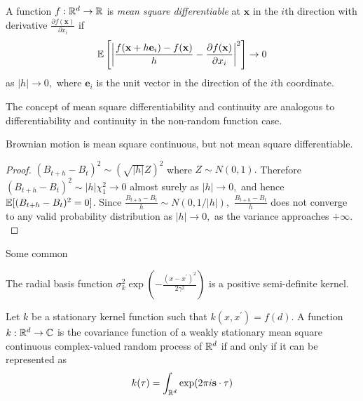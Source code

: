 \begin{definition}
    A function $f:\mathbb{R}^d\to\mathbb{R}$ is \emph{mean square differentiable} at
    $\mathbf{x}$ in the $i$th direction with derivative
    $\frac{\partial f(\mathbf{x})}{\partial x_i}$ if
    $$
        \operatorname{\mathbb{E}}\left[
            \left|
            \frac{f(\mathbf{x} + h\mathbf{e}_i) - f(\mathbf{x})}{h}
            - \frac{\partial f(\mathbf{x})}{\partial x_i}
            \right|^2
            \right]\to 0
    $$ as $|h|\to 0,$ where $\mathbf{e}_i$ is the unit vector in the direction
    of the $i$th coordinate.
\end{definition}

The concept of mean square differentiability and continuity are analogous to
differentiability and continuity in the non-random function case.

\begin{theorem}
    Brownian motion is mean square continuous, but not mean square
    differentiable.
\end{theorem}
\begin{proof}
    $(B_{t + h} - B_t)^2 \sim (\sqrt{|h|}Z)^2$ where $Z\sim N(0,1).$ Therefore
    $(B_{t + h} - B_t)^2 \sim |h|\chi_1^2 \to 0$ almost surely as $|h|\to 0,$
    and hence $\operatorname{\mathbb{E}}[(B_{t + h} - B_t)^2= 0]$. Since
    $\frac{B_{t + h} - B_t}{h} \sim N(0, 1/|h|),$ $\frac{B_{t + h} - B_t}{h}$
    does not converge to any valid probability distribution as $|h| \to 0,$ as
    the variance approaches $+\infty.$
\end{proof}

Some common

\color{red}

\begin{theorem}\label{thm:rbf_pos_def}
    The radial basis function
    ${\sigma^2_k}\exp(-\frac{(x - x^\prime)^2}{2\gamma^2})$ is a positive
    semi-definite kernel.
\end{theorem}

\begin{theorem}
    Let $k$ be a stationary kernel function such that
    $k(x, x^\prime) = f(d)$. A function $k:\mathbb{R}^d\to\mathbb{C}$ is the covariance
    function of a weakly
    stationary mean square continuous complex-valued random process of $\mathbb{R}^d$
    if and only if it can be represented as
    $$k(\mathbf{\tau}) = \int_{\mathbb{R}^d} \exp(2\pi i \mathbf{s}\cdot\mathbf{\tau})$$
\end{theorem}

\parencite[82]{rasmussen_gaussian_2008}

